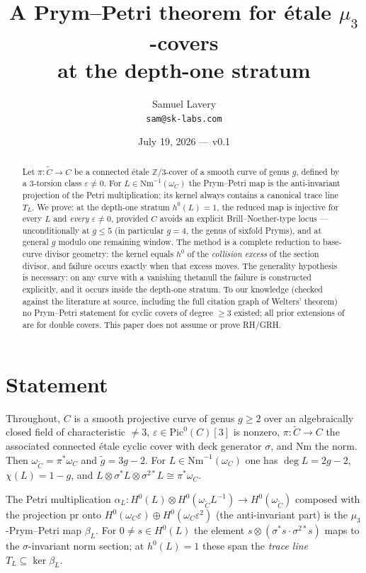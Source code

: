 \documentclass[11pt]{article}
\title{A Prym--Petri theorem for \'etale $\mu_3$-covers\\ at the depth-one stratum}
\author{Samuel Lavery\\ \texttt{sam@sk-labs.com}}
\date{July 19, 2026 --- v0.1}
\newcommand{\Nm}{\mathrm{Nm}}
\begin{document}
\maketitle

\begin{abstract}
Let $\pi:\widetilde C\to C$ be a connected \'etale $\mathbb{Z}/3$-cover of a smooth
curve of genus $g$, defined by a $3$-torsion class $\varepsilon\neq 0$.  For
$L\in\Nm^{-1}(\omega_C)$ the Prym--Petri map is the anti-invariant projection of the
Petri multiplication; its kernel always contains a canonical trace line $T_L$.  We
prove: at the depth-one stratum $h^0(L)=1$, the reduced map is injective for every
$L$ and \emph{every} $\varepsilon\neq0$, provided $C$ avoids an explicit
Brill--Noether-type locus --- unconditionally at $g\le 5$ (in particular $g=4$, the
genus of sixfold Pryms), and at general $g$ modulo one remaining window.  The method
is a complete reduction to base-curve divisor geometry: the kernel equals
$h^0$ of the \emph{collision excess} of the section divisor, and failure occurs
exactly when that excess moves.  The generality hypothesis is necessary: on any
curve with a vanishing thetanull the failure is constructed explicitly, and it
occurs inside the depth-one stratum.  To our knowledge (checked against the
literature at source, including the full citation graph of Welters' theorem) no
Prym--Petri statement for cyclic covers of degree $\ge 3$ existed; all prior
extensions of \cite{welters} are for double covers.  This paper does not assume or
prove RH/GRH.
\end{abstract}

\section{Statement}

Throughout, $C$ is a smooth projective curve of genus $g\ge2$ over an algebraically
closed field of characteristic $\neq 3$, $\varepsilon\in\mathrm{Pic}^0(C)[3]$ is
nonzero, $\pi:\widetilde C\to C$ the associated connected \'etale cyclic cover with
deck generator $\sigma$, and $\Nm$ the norm.  Then
$\omega_{\widetilde C}=\pi^*\omega_C$ and $\widetilde g=3g-2$.  For
$L\in\Nm^{-1}(\omega_C)$ one has $\deg L=2g-2$, $\chi(L)=1-g$, and
$L\otimes\sigma^*L\otimes\sigma^{2*}L\cong\pi^*\omega_C$.

The Petri multiplication
$\alpha_L:H^0(L)\otimes H^0(\omega_{\widetilde C}L^{-1})\to H^0(\omega_{\widetilde C})$
composed with the projection $\mathrm{pr}$ onto
$H^0(\omega_C\varepsilon)\oplus H^0(\omega_C\varepsilon^2)$ (the anti-invariant part)
is the $\mu_3$-Prym--Petri map $\beta_L$.  For $0\neq s\in H^0(L)$ the element
$s\otimes(\sigma^*s\cdot\sigma^{2*}s)$ maps to the $\sigma$-invariant norm section;
at $h^0(L)=1$ these span the \emph{trace line} $T_L\subseteq\ker\beta_L$.
\end{document}

